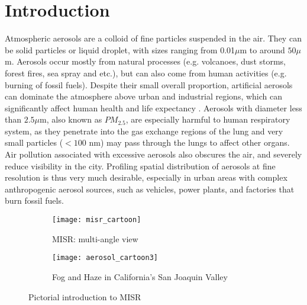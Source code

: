 \section{Introduction}
Atmospheric aerosols are a colloid of fine particles suspended in the air. They can be solid particles or liquid droplet, with sizes ranging from 0.01$\mu$m to around $50\mu$m. Aerosols occur mostly from natural processes (e.g. volcanoes, dust storms, forest fires, sea spray and etc.), but can also come from human activities (e.g. burning of fossil fuels). Despite their small overall proportion, artificial aerosols can dominate the atmosphere above urban and industrial regions, which can significantly affect human health and life expectancy \cite{Ulrich}. Aerosols with diameter less than $2.5\mu$m, also known as $PM_{2.5}$, are especially harmful to human respiratory system, as they penetrate into the gas exchange regions of the lung and very small particles ($<100$ nm) may pass through the lungs to affect other organs. Air pollution associated with excessive aerosols also obscures the air, and severely reduce visibility in the city. Profiling spatial distribution of aerosols at fine resolution is thus very much desirable, especially in urban areas with complex anthropogenic aerosol sources, such as vehicles, power plants, and factories that burn fossil fuels.

\begin{figure}[h!]
	\centering
	\begin{subfigure}{.45\textwidth}
		\centering
		\texttt{[image: misr\_cartoon]}
		\caption{MISR: multi-angle view}
		\label{fig:MISR_cartoon}
	\end{subfigure}
	\begin{subfigure}{.45\textwidth}
		\centering
		\texttt{[image: aerosol\_cartoon3]}
		\caption{Fog and Haze in California's San Joaquin Valley}
		\label{fig:MISR_california}
	\end{subfigure}
	\caption{Pictorial introduction to MISR}
	\label{fig:misr}
\end{figure}

